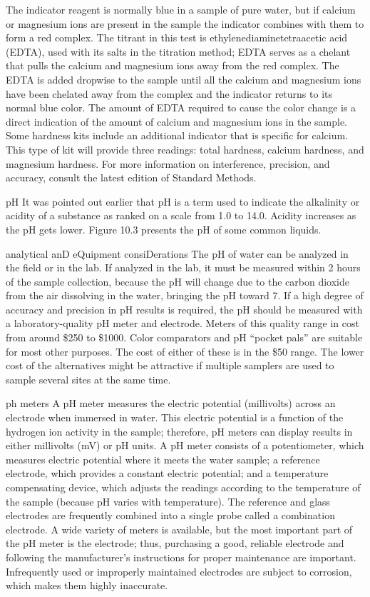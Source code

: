 \documentclass{article}
\begin{document}
The indicator reagent is normally blue in a sample of pure water, but if
calcium or magnesium ions are present in the sample the indicator
combines with them to form a red complex. The titrant in this test is
ethylenediaminetetraacetic acid (EDTA), used with its salts in the
titration method; EDTA serves as a chelant that pulls the calcium and
magnesium ions away from the red complex. The EDTA is added dropwise to
the sample until all the calcium and magnesium ions have been chelated
away from the complex and the indicator returns to its normal blue
color. The amount of EDTA required to cause the color change is a direct
indication of the amount of calcium and magnesium ions in the sample.
Some hardness kits include an additional indicator that is specific for
calcium. This type of kit will provide three readings: total hardness,
calcium hardness, and magnesium hardness. For more information on
interference, precision, and accuracy, consult the latest edition of
Standard Methods.

pH It was pointed out earlier that pH is a term used to indicate the
alkalinity or acidity of a substance as ranked on a scale from 1.0 to
14.0. Acidity increases as the pH gets lower. Figure 10.3 presents the
pH of some common liquids.

analytical anD eQuipment consiDerations The pH of water can be analyzed
in the field or in the lab. If analyzed in the lab, it must be measured
within 2 hours of the sample collection, because the pH will change due
to the carbon dioxide from the air dissolving in the water, bringing the
pH toward 7. If a high degree of accuracy and precision in pH results is
required, the pH should be measured with a laboratory-quality pH meter
and electrode. Meters of this quality range in cost from around \$250 to
\$1000. Color comparators and pH ``pocket pals'' are suitable for most
other purposes. The cost of either of these is in the \$50 range. The
lower cost of the alternatives might be attractive if multiple samplers
are used to sample several sites at the same time.

ph meters A pH meter measures the electric potential (millivolts) across
an electrode when immersed in water. This electric potential is a
function of the hydrogen ion activity in the sample; therefore, pH
meters can display results in either millivolts (mV) or pH units. A pH
meter consists of a potentiometer, which measures electric potential
where it meets the water sample; a reference electrode, which provides a
constant electric potential; and a temperature compensating device,
which adjusts the readings according to the temperature of the sample
(because pH varies with temperature). The reference and glass electrodes
are frequently combined into a single probe called a combination
electrode. A wide variety of meters is available, but the most important
part of the pH meter is the electrode; thus, purchasing a good, reliable
electrode and following the manufacturer's instructions for proper
maintenance are important. Infrequently used or improperly maintained
electrodes are subject to corrosion, which makes them highly inaccurate.
\end{document}
